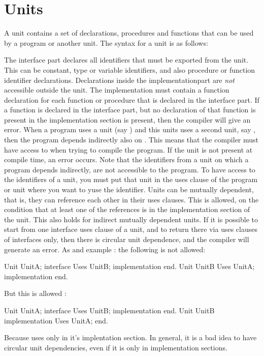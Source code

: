 \documentclass{report}
\begin{document}
\section{Units}
A unit contains a set of declarations, procedures and functions that can be
used by a program or another unit.
The syntax for a unit is as follows:

The interface part declares all identifiers that must be exported from the
unit. This can be constant, type or variable identifiers, and also procedure
or function identifier declarations. Declarations inside the
implementationpart are {\em not} accessible outside the unit. The
implementation must contain a function declaration for each function or
procedure that is declared in the interface part. If a function is declared
in the interface part, but no declaration of that function is present in the 
implementation section is present, then the compiler will give an error.
When a program uses a unit (say ) and this units uses a second
unit, say , then the program depends indirectly also on
. This means that the compiler must have access to  when
trying to compile the program. If the unit is not present at compile time,
an error occurs.
Note that the identifiers from a unit on which a program depends indirectly,
are not accessible to the program. To have access to the identifiers of a
unit, you must put that unit in the uses clause of the program or unit where
you want to yuse the identifier.
Units can be mutually dependent, that is, they can reference each other in
their uses clauses. This is allowed, on the condition that at least one of
the references is in the implementation section of the unit. This also holds
for indirect mutually dependent units. 
If it is possible to start from one interface uses clause of a unit, and to return
there via uses clauses of interfaces only, then there is circular unit
dependence, and the compiler will generate an error.
As and example : the following is not allowed:
\begin{listing}
Unit UnitA;
interface
Uses UnitB;
implementation
end.
Unit UnitB
Uses UnitA;
implementation 
end.
\end{listing}
But this is allowed :
\begin{listing}
Unit UnitA;
interface
Uses UnitB;
implementation
end.
Unit UnitB
implementation 
Uses UnitA;
end.
\end{listing}
Because  uses  only in it's implentation section.
In general, it is a bad idea to have circular unit dependencies, even if it is
only in implementation sections.
\end{document}
